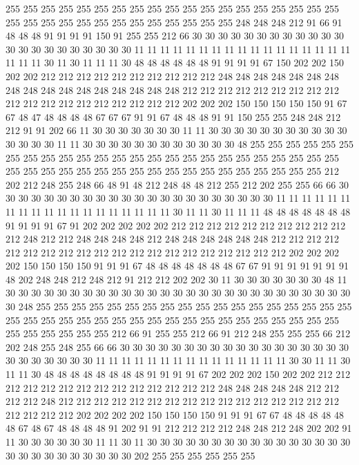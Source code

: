 255 255 255 255 255 255 255 255 255 255 255 255 255 255 255 255 255 255 255 255
255 255 255 255 255 255 255 255 255 255 255 255 248 248 248 212 91 66 91 48
48 48 91 91 91 91 150 91 255 255 212 66 30 30 30 30 30 30 30 30
30 30 30 30 30 30 30 30 30 30 30 30 30 30 11 11 11 11 11 11
11 11 11 11 11 11 11 11 11 11 11 11 11 11 30 11 30 11 11 11
30 48 48 48 48 48 48 91 91 91 91 67 150 202 202 150 202 202 212 212
212 212 212 212 212 212 212 212 248 248 248 248 248 248 248 248 248 248 248 248
248 248 248 248 248 212 212 212 212 212 212 212 212 212 212 212 212 212 212 212
212 212 212 212 202 202 202 150 150 150 150 150 91 67 67 48 47 48 48 48
48 67 67 67 91 91 67 48 48 48 91 91 150 255 255 248 248 212 212 91
91 202 66 11 30 30 30 30 30 30 30 11 11 30 30 30 30 30 30 30
30 30 30 30 30 30 30 30 11 11 30 30 30 30 30 30 30 30 30 30
30 30 48 255 255 255 255 255 255 255 255 255 255 255 255 255 255 255 255 255
255 255 255 255 255 255 255 255 255 255 255 255 255 255 255 255 255 255 255 255
255 255 255 255 255 255 212 202 212 248 255 248 66 48 91 48 212 248 48 48
212 255 212 202 255 255 66 66 30 30 30 30 30 30 30 30 30 30 30 30
30 30 30 30 30 30 30 30 30 30 11 11 11 11 11 11 11 11 11 11
11 11 11 11 11 11 11 11 11 30 11 11 30 11 11 11 48 48 48 48
48 48 48 91 91 91 91 67 91 202 202 202 202 202 212 212 212 212 212 212
212 212 212 212 212 248 212 212 248 248 248 248 212 248 248 248 248 248 248 212
212 212 212 212 212 212 212 212 212 212 212 212 212 212 212 212 212 212 212 202
202 202 202 150 150 150 150 91 91 91 67 48 48 48 48 48 48 48 67 67
91 91 91 91 91 91 91 48 202 248 248 212 248 212 91 212 212 202 202 30
11 30 30 30 30 30 30 30 48 11 30 30 30 30 30 30 30 30 30 30
30 30 30 30 30 30 30 30 30 30 30 30 30 30 30 30 30 30 248 255
255 255 255 255 255 255 255 255 255 255 255 255 255 255 255 255 255 255 255 255
255 255 255 255 255 255 255 255 255 255 255 255 255 255 255 255 255 255 255 255
255 255 212 66 91 255 255 212 66 91 212 248 255 255 255 66 212 202 248 255
248 255 66 66 30 30 30 30 30 30 30 30 30 30 30 30 30 30 30 30
30 30 30 30 30 30 30 30 30 11 11 11 11 11 11 11 11 11 11 11
11 11 11 11 30 30 11 11 30 11 11 30 48 48 48 48 48 48 48 48
91 91 91 91 67 202 202 202 150 202 202 212 212 212 212 212 212 212 212 212
212 212 212 212 212 248 248 248 248 248 212 212 212 212 248 212 212 212 212 212
212 212 212 212 212 212 212 212 212 212 212 212 212 212 212 202 202 202 202 150
150 150 150 91 91 91 67 67 48 48 48 48 48 48 67 48 67 48 48 48
48 91 202 91 91 212 212 212 212 248 248 212 248 202 202 91 11 30 30 30
30 30 30 11 11 30 11 30 30 30 30 30 30 30 30 30 30 30 30 30
30 30 30 30 30 30 30 30 30 30 30 30 30 202 255 255 255 255 255 255
